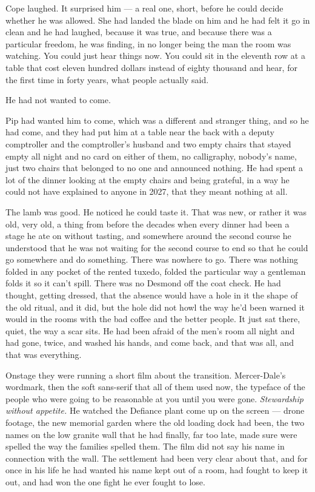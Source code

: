 \documentclass[11pt,openany]{book}
\newcommand{\scenebreak}{\par\vspace{0.5\baselineskip}\begin{center}\textasteriskcentered\quad\textasteriskcentered\quad\textasteriskcentered\end{center}\vspace{0.5\baselineskip}\par}
\begin{document}
Cope laughed. It surprised him --- a real one, short, before he could decide whether he was allowed. She had landed the blade on him and he had felt it go in clean and he had laughed, because it was true, and because there was a particular freedom, he was finding, in no longer being the man the room was watching. You could just hear things now. You could sit in the eleventh row at a table that cost eleven hundred dollars instead of eighty thousand and hear, for the first time in forty years, what people actually said.


\scenebreak


He had not wanted to come.

Pip had wanted him to come, which was a different and stranger thing, and so he had come, and they had put him at a table near the back with a deputy comptroller and the comptroller's husband and two empty chairs that stayed empty all night and no card on either of them, no calligraphy, nobody's name, just two chairs that belonged to no one and announced nothing. He had spent a lot of the dinner looking at the empty chairs and being grateful, in a way he could not have explained to anyone in 2027, that they meant nothing at all.

The lamb was good. He noticed he could taste it. That was new, or rather it was old, very old, a thing from before the decades when every dinner had been a stage he ate on without tasting, and somewhere around the second course he understood that he was not waiting for the second course to end so that he could go somewhere and do something. There was nowhere to go. There was nothing folded in any pocket of the rented tuxedo, folded the particular way a gentleman folds it so it can't spill. There was no Desmond off the coat check. He had thought, getting dressed, that the absence would have a hole in it the shape of the old ritual, and it did, but the hole did not howl the way he'd been warned it would in the rooms with the bad coffee and the better people. It just sat there, quiet, the way a scar sits. He had been afraid of the men's room all night and had gone, twice, and washed his hands, and come back, and that was all, and that was everything.

Onstage they were running a short film about the transition. Mercer-Dale's wordmark, then the soft sans-serif that all of them used now, the typeface of the people who were going to be reasonable at you until you were gone. \textit{Stewardship without appetite.} He watched the Defiance plant come up on the screen --- drone footage, the new memorial garden where the old loading dock had been, the two names on the low granite wall that he had finally, far too late, made sure were spelled the way the families spelled them. The film did not say his name in connection with the wall. The settlement had been very clear about that, and for once in his life he had wanted his name kept out of a room, had fought to keep it out, and had won the one fight he ever fought to lose.
\end{document}
